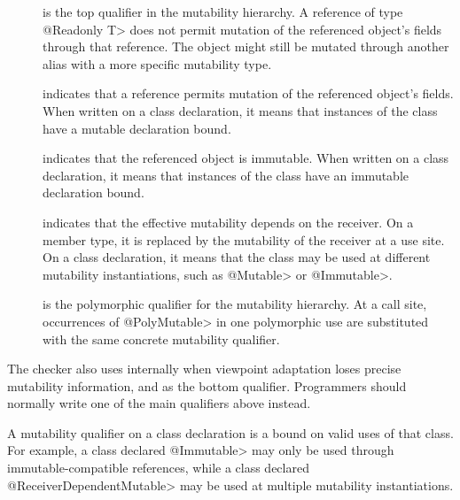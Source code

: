 \begin{description}

\item[]
  is the top qualifier in the mutability hierarchy.
  A reference of type \<@Readonly T> does not permit mutation of the
  referenced object's fields through that reference.
  The object might still be mutated through another alias with a more
  specific mutability type.

\item[]
  indicates that a reference permits mutation of the referenced object's
  fields.  When written on a class declaration, it means that instances of
  the class have a mutable declaration bound.

\item[]
  indicates that the referenced object is immutable.  When written on a
  class declaration, it means that instances of the class have an immutable
  declaration bound.

\item[]
  indicates that the effective mutability depends on the receiver.
  On a member type, it is replaced by the mutability of the receiver at a
  use site.  On a class declaration, it means that the class may be used at
  different mutability instantiations, such as \<@Mutable> or \<@Immutable>.

\item[]
  is the polymorphic qualifier for the mutability hierarchy.
  At a call site, occurrences of \<@PolyMutable> in one polymorphic use are
  substituted with the same concrete mutability qualifier.

\end{description}

The checker also uses
 internally when viewpoint
adaptation loses precise mutability information, and
 as the bottom qualifier.
Programmers should normally write one of the main qualifiers above instead.


A mutability qualifier on a class declaration is a bound on valid uses of that
class.  For example, a class declared \<@Immutable> may only be used through
immutable-compatible references, while a class declared
\<@ReceiverDependentMutable> may be used at multiple mutability
instantiations.

